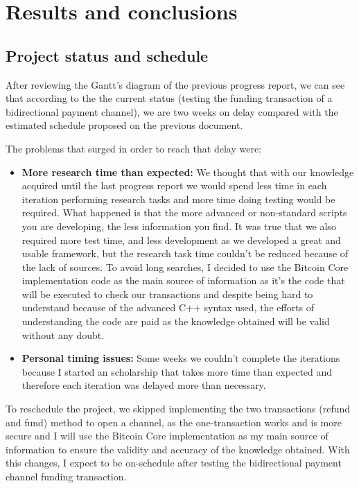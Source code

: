 \chapter*{Results and conclusions}
\label{chap:conclusions}
\section{Project status and schedule}
After reviewing the Gantt's diagram of the previous progress report, we can see that according to the the current status (testing the funding transaction of a bidirectional payment channel), we are two weeks on delay compared with the estimated schedule proposed on the previous document.

The problems that surged in order to reach that delay were:
\begin{itemize}
    \item \textbf{More research time than expected:} We thought that with our knowledge acquired until the last progress report we would spend less time in each iteration performing research tasks and more time doing testing would be required. What happened is that the more advanced or non-standard scripts you are developing, the less information you find. It was true that we also required more test time, and less development as we developed a great and usable framework, but the research task time couldn't be reduced because of the lack of sources. To avoid long searches, I decided to use the Bitcoin Core implementation code as the main source of information as it's the code that will be executed to check our transactions and despite being hard to understand because of the advanced C++ syntax used, the efforts of understanding the code are paid as the knowledge obtained will be valid without any doubt.
\item \textbf{Personal timing issues:} Some weeks we couldn't complete the iterations because I started an scholarship that takes more time than expected and therefore each iteration was delayed more than necessary.
\end{itemize}

To reschedule the project, we skipped implementing the two transactions (refund and fund) method to open a channel, as the one-transaction works and is more secure and I will use the Bitcoin Core implementation as my main source of information to ensure the validity and accuracy of the knowledge obtained. With this changes, I expect to be on-schedule after testing the bidirectional payment channel funding transaction.
